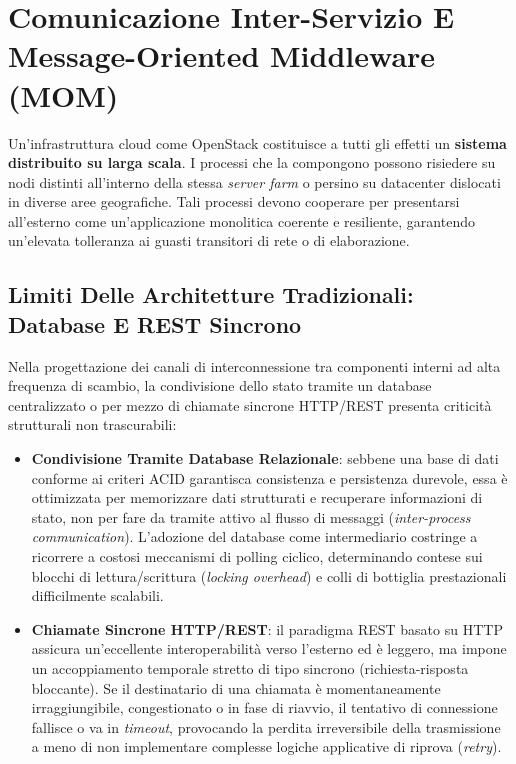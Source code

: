 \documentclass[11pt, a4paper]{article}
\begin{document}
\newpage


\section{Comunicazione Inter-Servizio E Message-Oriented Middleware (MOM)}

Un'infrastruttura cloud come OpenStack costituisce a tutti gli effetti un \textbf{sistema distribuito su larga scala}. I processi che la compongono possono risiedere su nodi distinti all'interno della stessa \emph{server farm} o persino su datacenter dislocati in diverse aree geografiche. Tali processi devono cooperare per presentarsi all'esterno come un'applicazione monolitica coerente e resiliente, garantendo un'elevata tolleranza ai guasti transitori di rete o di elaborazione.

\subsection{Limiti Delle Architetture Tradizionali: Database E REST Sincrono}

Nella progettazione dei canali di interconnessione tra componenti interni ad alta frequenza di scambio, la condivisione dello stato tramite un database centralizzato o per mezzo di chiamate sincrone HTTP/REST presenta criticità strutturali non trascurabili:
\begin{itemize}
    \item \textbf{Condivisione Tramite Database Relazionale}: sebbene una base di dati conforme ai criteri ACID garantisca consistenza e persistenza durevole, essa è ottimizzata per memorizzare dati strutturati e recuperare informazioni di stato, non per fare da tramite attivo al flusso di messaggi (\emph{inter-process communication}). L'adozione del database come intermediario costringe a ricorrere a costosi meccanismi di polling ciclico, determinando contese sui blocchi di lettura/scrittura (\emph{locking overhead}) e colli di bottiglia prestazionali difficilmente scalabili.
    \item \textbf{Chiamate Sincrone HTTP/REST}: il paradigma REST basato su HTTP assicura un'eccellente interoperabilità verso l'esterno ed è leggero, ma impone un accoppiamento temporale stretto di tipo sincrono (richiesta-risposta bloccante). Se il destinatario di una chiamata è momentaneamente irraggiungibile, congestionato o in fase di riavvio, il tentativo di connessione fallisce o va in \emph{timeout}, provocando la perdita irreversibile della trasmissione a meno di non implementare complesse logiche applicative di riprova (\emph{retry}).
\end{itemize}
\end{document}

